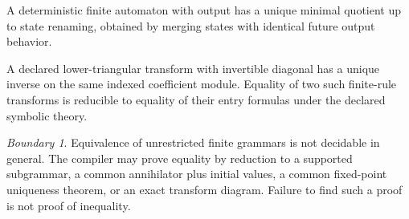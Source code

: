 \documentclass[11pt]{article}
\theoremstyle{definition}\newtheorem{definition}[theorem]{Definition}\newtheorem{example}[theorem]{Example}\newtheorem{construction}[theorem]{Construction}\newtheorem{algorithm}[theorem]{Algorithm}\newtheorem{conjecture}[theorem]{Conjecture}\newtheorem{problem}[theorem]{Problem}
\theoremstyle{remark}\newtheorem{remark}[theorem]{Remark}\newtheorem{boundary}[theorem]{Boundary}\newtheorem{certificate}[theorem]{Computational Certificate}\newtheorem{classical}[theorem]{Classical Input}\newtheorem{principle}[theorem]{Structural Principle}
\begin{document}
\begin{proposition}
A deterministic finite automaton with output has a unique minimal quotient up to state renaming, obtained by merging states with identical future output behavior.
\end{proposition}

\begin{proposition}
A declared lower-triangular transform with invertible diagonal has a unique inverse on the same indexed coefficient module.  Equality of two such finite-rule transforms is reducible to equality of their entry formulas under the declared symbolic theory.
\end{proposition}

\begin{boundary}
Equivalence of unrestricted finite grammars is not decidable in general.  The compiler may prove equality by reduction to a supported subgrammar, a common annihilator plus initial values, a common fixed-point uniqueness theorem, or an exact transform diagram.  Failure to find such a proof is not proof of inequality.
\end{boundary}
\end{document}

